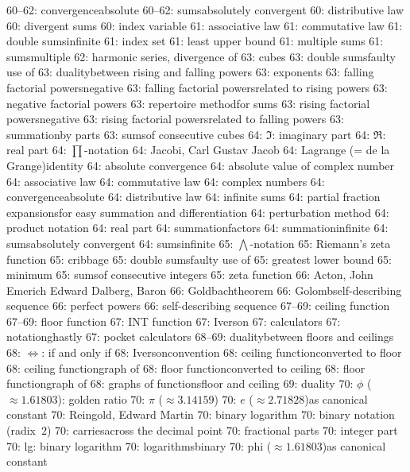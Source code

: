  60--62: convergence\sub absolute
 60--62: sums\sub absolutely convergent
 60: distributive law
 60: divergent sums
 60: index variable
 61: associative law
 61: commutative law
 61: double sums\sub infinite
 61: index set
 61: least upper bound
 61: multiple sums
 61: sums\sub multiple
 62: harmonic series, divergence of
 63: cubes
 63: double sums\sub faulty use of
 63: duality\sub between rising and falling powers
 63: exponents
 63: falling factorial powers\sub negative
 63: falling factorial powers\sub related to rising powers
 63: negative factorial powers
 63: repertoire method\sub for sums
 63: rising factorial powers\sub negative
 63: rising factorial powers\sub related to falling powers
 63: summation\sub by parts
 63: sums\sub of consecutive cubes
 64: $\Im$: imaginary part
 64: $\Re$: real part
 64: $\prod$-notation
 64: Jacobi, Carl Gustav Jacob
 64: Lagrange (= de la Grange)\sub identity
 64: absolute convergence
 64: absolute value of complex number
 64: associative law
 64: commutative law
 64: complex numbers
 64: convergence\sub absolute
 64: distributive law
 64: infinite sums
 64: partial fraction expansions\sub for easy summation and differentiation
 64: perturbation method
 64: product notation
 64: real part
 64: summation\sub factors
 64: summation\sub infinite
 64: sums\sub absolutely convergent
 64: sums\sub infinite
 65: $\bigwedge$-notation
 65: Riemann's zeta function
 65: cribbage
 65: double sums\sub faulty use of
 65: greatest lower bound
 65: minimum
 65: sums\sub of consecutive integers
 65: zeta function
 66: Acton, John Emerich Edward Dalberg, Baron
 66: Goldbach\sub theorem
 66: Golomb\sub self-describing sequence
 66: perfect powers
 66: self-describing sequence
 67--69: ceiling function
 67--69: floor function
 67: INT function
 67: Iverson
 67: calculators
 67: notation\sub ghastly
 67: pocket calculators
 68--69: duality\sub between floors and ceilings
 68: $\Longleftrightarrow$: if and only if
 68: Iverson\sub convention
 68: ceiling function\sub converted to floor
 68: ceiling function\sub graph of
 68: floor function\sub converted to ceiling
 68: floor function\sub graph of
 68: graphs of functions\sub floor and ceiling
 69: duality
 70: $\phi$ ($\approx1.61803$): golden ratio
 70: $\pi$ ($\approx3.14159$)
 70: $e$ ($\approx2.71828$)\sub as canonical constant
 70: Reingold, Edward Martin
 70: binary logarithm
 70: binary notation (radix~$2$)
 70: carries\sub across the decimal point
 70: fractional parts
 70: integer part
 70: lg: binary logarithm
 70: logarithms\sub binary
 70: phi ($\approx1.61803$)\sub as canonical constant
